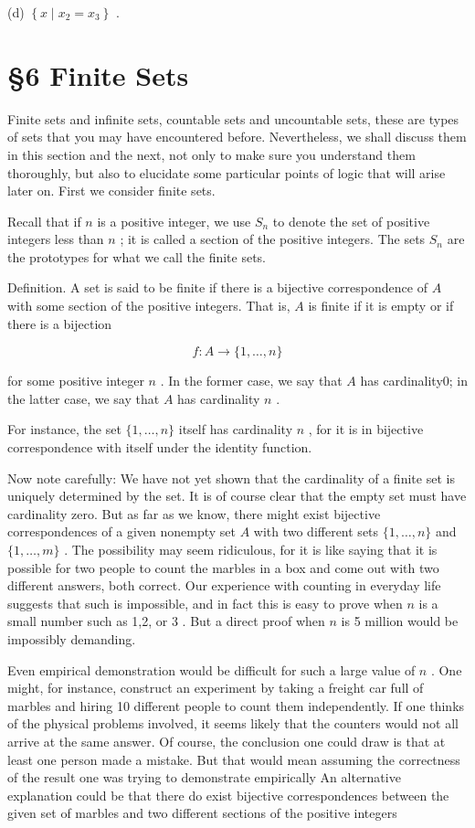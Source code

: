 (d) \(\left\{  {x \mid  {x}_{2} = {x}_{3}}\right\}\) .

\section*{§6 Finite Sets}

Finite sets and infinite sets, countable sets and uncountable sets, these are types of sets that you may have encountered before. Nevertheless, we shall discuss them in this section and the next, not only to make sure you understand them thoroughly, but also to elucidate some particular points of logic that will arise later on. First we consider finite sets.

Recall that if \(n\) is a positive integer, we use \({S}_{n}\) to denote the set of positive integers less than \(n\) ; it is called a section of the positive integers. The sets \({S}_{n}\) are the prototypes for what we call the finite sets.

Definition. A set is said to be finite if there is a bijective correspondence of \(A\) with some section of the positive integers. That is, \(A\) is finite if it is empty or if there is a bijection

\[
f : A \rightarrow  \{ 1,\ldots ,n\}
\]

for some positive integer \(n\) . In the former case, we say that \(A\) has cardinality0; in the latter case, we say that \(A\) has cardinality \(n\) .

For instance, the set \(\{ 1,\ldots ,n\}\) itself has cardinality \(n\) , for it is in bijective correspondence with itself under the identity function.

Now note carefully: We have not yet shown that the cardinality of a finite set is uniquely determined by the set. It is of course clear that the empty set must have cardinality zero. But as far as we know, there might exist bijective correspondences of a given nonempty set \(A\) with two different sets \(\{ 1,\ldots ,n\}\) and \(\{ 1,\ldots ,m\}\) . The possibility may seem ridiculous, for it is like saying that it is possible for two people to count the marbles in a box and come out with two different answers, both correct. Our experience with counting in everyday life suggests that such is impossible, and in fact this is easy to prove when \(n\) is a small number such as 1,2, or 3 . But a direct proof when \(n\) is 5 million would be impossibly demanding.

Even empirical demonstration would be difficult for such a large value of \(n\) . One might, for instance, construct an experiment by taking a freight car full of marbles and hiring 10 different people to count them independently. If one thinks of the physical problems involved, it seems likely that the counters would not all arrive at the same answer. Of course, the conclusion one could draw is that at least one person made a mistake. But that would mean assuming the correctness of the result one was trying to demonstrate empirically An alternative explanation could be that there do exist bijective correspondences between the given set of marbles and two different sections of the positive integers

